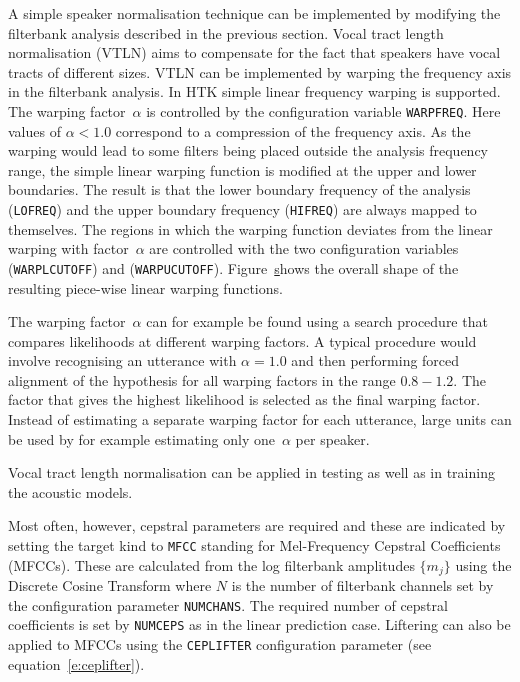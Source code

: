 
A simple speaker normalisation technique can be implemented by
modifying the filterbank analysis described in the previous section.
Vocal tract length normalisation (VTLN) aims to compensate for the
fact that speakers have vocal tracts of different sizes. VTLN can be
implemented by warping the frequency axis in the filterbank analysis.
In HTK simple linear frequency warping is supported. The warping
factor~$\alpha$ is controlled by the configuration variable
\texttt{WARPFREQ}. Here values of
$\alpha < 1.0$ correspond to a compression of the frequency axis. As
the warping would lead to some filters being placed outside the
analysis frequency range, the simple linear warping function is
modified at the upper and lower boundaries. The result is that the
lower boundary frequency of the analysis
(\texttt{LOFREQ}) and the upper
boundary frequency (\texttt{HIFREQ})
are always mapped to themselves. The regions in which the warping
function deviates from the linear warping with factor~$\alpha$ are
controlled with the two configuration variables
(\texttt{WARPLCUTOFF}) and
(\texttt{WARPUCUTOFF}).
Figure~\href{f:vtlnpiecewise} shows the overall shape of the resulting
piece-wise linear warping functions.


The warping factor~$\alpha$ can for example be found using a search
procedure that compares likelihoods at different warping factors. A
typical procedure would involve recognising an utterance with
$\alpha=1.0$ and then performing forced alignment of the hypothesis
for all warping factors in the range $0.8 - 1.2$. The factor that
gives the highest likelihood is selected as the final warping factor.
Instead of estimating a separate warping factor for each utterance,
large units can be used by for example estimating only one~$\alpha$
per speaker. 

Vocal tract length normalisation can be applied in testing as well as
in training the acoustic models.


Most often, however, cepstral parameters are required
and these are indicated by setting the target kind to \texttt{MFCC} standing
for Mel-Frequency Cepstral Coefficients (MFCCs).  These are calculated from the
log filterbank amplitudes $\{m_j\}$ using the Discrete Cosine Transform
where $N$ is the number of filterbank channels set by the configuration
parameter \texttt{NUMCHANS}.  The required
number of cepstral coefficients is set by
\texttt{NUMCEPS} as in the linear prediction
case.  Liftering can also be applied to MFCCs using the
\texttt{CEPLIFTER} configuration parameter
(see equation~\ref{e:ceplifter}).

